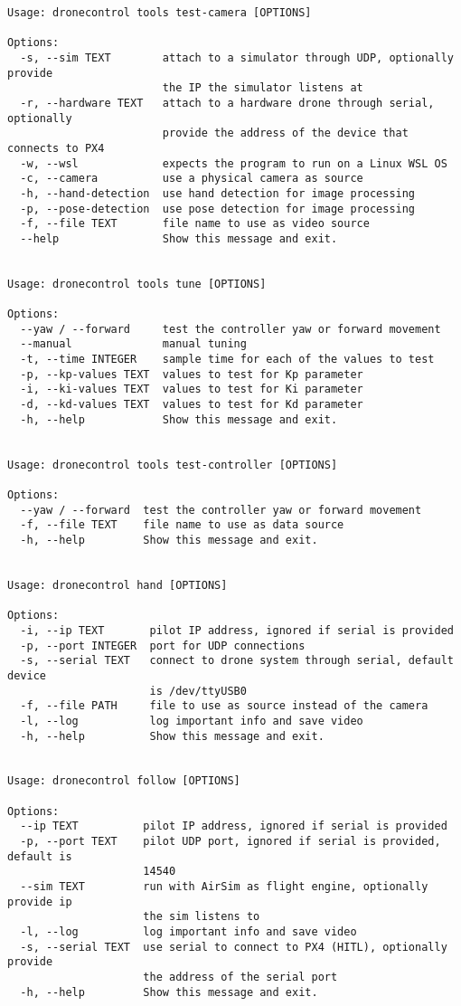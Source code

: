 \begin{verbatim}
Usage: dronecontrol tools test-camera [OPTIONS]

Options:
  -s, --sim TEXT        attach to a simulator through UDP, optionally provide
                        the IP the simulator listens at
  -r, --hardware TEXT   attach to a hardware drone through serial, optionally
                        provide the address of the device that connects to PX4
  -w, --wsl             expects the program to run on a Linux WSL OS
  -c, --camera          use a physical camera as source
  -h, --hand-detection  use hand detection for image processing
  -p, --pose-detection  use pose detection for image processing
  -f, --file TEXT       file name to use as video source
  --help                Show this message and exit.


Usage: dronecontrol tools tune [OPTIONS]

Options:
  --yaw / --forward     test the controller yaw or forward movement
  --manual              manual tuning
  -t, --time INTEGER    sample time for each of the values to test
  -p, --kp-values TEXT  values to test for Kp parameter
  -i, --ki-values TEXT  values to test for Ki parameter
  -d, --kd-values TEXT  values to test for Kd parameter
  -h, --help            Show this message and exit.


Usage: dronecontrol tools test-controller [OPTIONS]

Options:
  --yaw / --forward  test the controller yaw or forward movement
  -f, --file TEXT    file name to use as data source
  -h, --help         Show this message and exit.


Usage: dronecontrol hand [OPTIONS]

Options:
  -i, --ip TEXT       pilot IP address, ignored if serial is provided
  -p, --port INTEGER  port for UDP connections
  -s, --serial TEXT   connect to drone system through serial, default device
                      is /dev/ttyUSB0
  -f, --file PATH     file to use as source instead of the camera
  -l, --log           log important info and save video
  -h, --help          Show this message and exit.


Usage: dronecontrol follow [OPTIONS]

Options:
  --ip TEXT          pilot IP address, ignored if serial is provided
  -p, --port TEXT    pilot UDP port, ignored if serial is provided, default is
                     14540
  --sim TEXT         run with AirSim as flight engine, optionally provide ip
                     the sim listens to
  -l, --log          log important info and save video
  -s, --serial TEXT  use serial to connect to PX4 (HITL), optionally provide
                     the address of the serial port
  -h, --help         Show this message and exit.
\end{verbatim}

